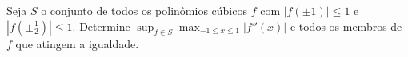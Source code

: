 Seja \(S\) o conjunto de todos os polinômios cúbicos \(f\) com \(|f(\pm 1)| \leq 1\) e \(|f(\pm \frac{1}{2})| \leq 1\). Determine \(\sup_{f \in S} \max_{-1 \leq x \leq 1} |f''(x)|\) e todos os membros de \(f\) que atingem a igualdade.
